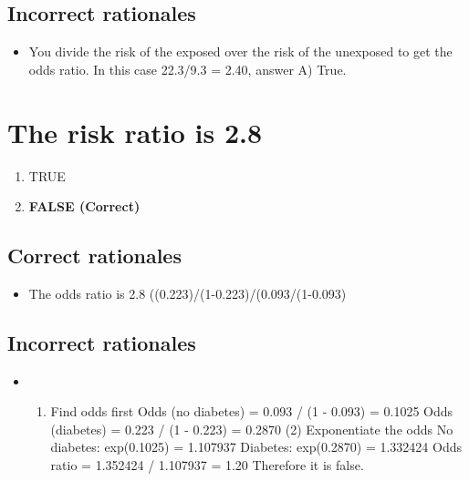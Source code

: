 \documentclass[letterpaper,9pt,twoside,printwatermark=false]{pinp}
\providecommand{\tightlist}{%
  \setlength{\itemsep}{0pt}\setlength{\parskip}{0pt}}
\begin{document}
\subsection{Incorrect rationales}\label{incorrect-rationales-1}

\begin{itemize}
\tightlist
\item
  You divide the risk of the exposed over the risk of the unexposed to
  get the odds ratio. In this case 22.3/9.3 = 2.40, answer A) True.
\end{itemize}

\section{The risk ratio is 2.8}\label{the-risk-ratio-is-2.8}

\begin{enumerate}
\def\labelenumi{\alph{enumi}.}
\tightlist
\item
  TRUE
\item
  \textbf{FALSE (Correct)}
\end{enumerate}

\subsection{Correct rationales}\label{correct-rationales-2}

\begin{itemize}
\tightlist
\item
  The odds ratio is 2.8 ((0.223)/(1-0.223)/(0.093/(1-0.093)
\end{itemize}

\subsection{Incorrect rationales}\label{incorrect-rationales-2}

\begin{itemize}
\item
  \begin{enumerate}
  \def\labelenumi{(\arabic{enumi})}
  \tightlist
  \item
    Find odds first Odds (no diabetes) = 0.093 / (1 - 0.093) = 0.1025
    Odds (diabetes) = 0.223 / (1 - 0.223) = 0.2870 (2) Exponentiate the
    odds No diabetes: exp(0.1025) = 1.107937 Diabetes: exp(0.2870) =
    1.332424 Odds ratio = 1.352424 / 1.107937 = 1.20 Therefore it is
    false.
  \end{enumerate}
\end{itemize}
\end{document}
